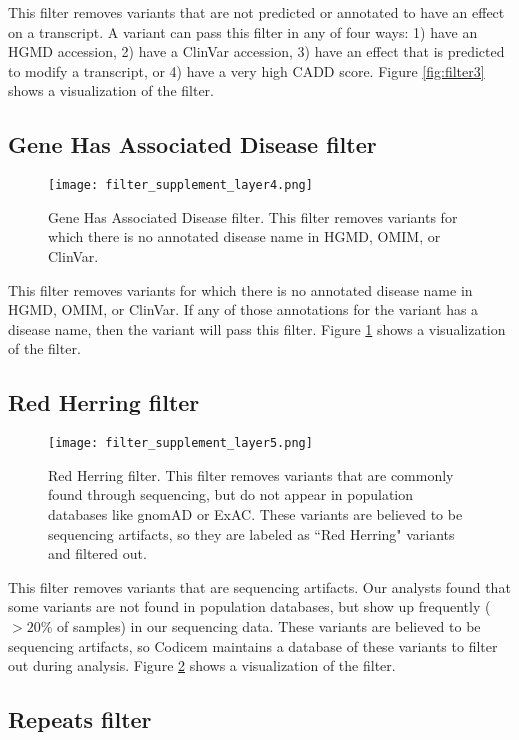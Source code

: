 \documentclass{article}
\begin{document}
This filter removes variants that are not predicted or annotated to have an effect on a transcript.  A variant can pass this filter in any of four ways: 1) have an HGMD accession, 2) have a ClinVar accession, 3) have an effect that is predicted to modify a transcript, or 4) have a very high CADD score.  Figure \ref{fig:filter3} shows a visualization of the filter.

\subsection{Gene Has Associated Disease filter}

\begin{figure}
\centering
\texttt{[image: filter\_supplement\_layer4.png]}
\caption{Gene Has Associated Disease filter.  This filter removes variants for which there is no annotated disease name in HGMD, OMIM, or ClinVar.}
\label{fig:filter4}
\end{figure}

This filter removes variants for which there is no annotated disease name in HGMD, OMIM, or ClinVar.  If any of those annotations for the variant has a disease name, then the variant will pass this filter.  Figure \ref{fig:filter4} shows a visualization of the filter.

\subsection{Red Herring filter}

\begin{figure}
\centering
\texttt{[image: filter\_supplement\_layer5.png]}
\caption{Red Herring filter.  This filter removes variants that are commonly found through sequencing, but do not appear in population databases like gnomAD or ExAC.  These variants are believed to be sequencing artifacts, so they are labeled as ``Red Herring" variants and filtered out.}
\label{fig:filter5}
\end{figure}

This filter removes variants that are sequencing artifacts.  Our analysts found that some variants are not found in population databases, but show up frequently ($>20$\% of samples) in our sequencing data.  These variants are believed to be sequencing artifacts, so Codicem maintains a database of these variants to filter out during analysis.  Figure \ref{fig:filter5} shows a visualization of the filter.

\subsection{Repeats filter}
\end{document}
